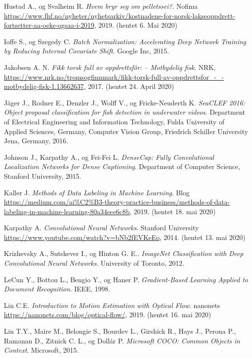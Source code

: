 \documentclass[11ot]{article}
\begin{document}
\begin{thebibliography}{9}
Hustad A., og Svalheim R.
\textit{Hvem bryr seg om pelletssei?}. 
Nofima \url{https://www.fhf.no/nyheter/nyhetsarkiv/kostnadene-for-norsk-lakseoppdrett-fortsetter-aa-oeke-ogsaa-i-2019}, 2019. (hentet 6. Mai 2020)

Ioffe S., og Szegedy C. 
\textit{Batch Normalization: Accelerating Deep Network Training by Reducing Internal Covariate Shift}. 
Google Inc, 2015.

Jakobsen A. N.
\textit{Fikk torsk full av oppdrettsfôr: – Motbydelig fisk}. 
NRK, \url{https://www.nrk.no/tromsogfinnmark/fikk-torsk-full-av-oppdrettsfor_-_-motbydelig-fisk-1.13662637}, 2017. (hentet 24. April 2020)

Jäger J., Rodner E., Denzler J., Wolff V., og Fricke-Neuderth K. 
\textit{SeaCLEF 2016: Object proposal classification for fish detection in underwater videos}. 
Department of Electrical Engineering and Information Technology, Fulda University of Applied Sciences, Germany, Computer Vision Group, Friedrich Schiller University Jena, Germany, 2016.

Johnson J., Karpathy A., og Fei-Fei L. 
\textit{DenseCap: Fully Convolutional Localization Networks for Dense Captioning}. 
Department of Computer Science, Stanford University, 2015.

Kaller J. 
\textit{Methods of Data Labeling in Machine Learning}. 
Blog \url{https://medium.com/ai%C2%B3-theory-practice-business/methods-of-data-labeling-in-machine-learning-80a34ece6c8b}, 2019. (hentet 18. mai 2020)

Karpathy A. 
\textit{Convolutional Neural Networks}. 
Stanford University \url{https://www.youtube.com/watch?v=bNb2fEVKeEo}, 2014. (hentet 13. mai 2020)

Krizhevsky A., Sutskever  I., og Hinton G. E.. 
\textit{ImageNet Classification with Deep Convolutional Neural Networks}. 
University of Toronto, 2012.

LeCun Y., Bottou L., Bengio Y., og Haner P. 
\textit{Gradient-Based Learning Applied to Document Recognition}. 
IEEE, 1998.

Lin C.E. 
\textit{Introduction to Motion Estimation with Optical Flow}. 
nanonets \url{https://nanonets.com/blog/optical-flow/}, 2019. (hentet 16. mai 2020)

Lin T.Y., Maire M., Belongie S., Bourdev L., Girshick R., Hays J., Perona P., Ramanan D., Zitnick C. L., og Dollár P. 
\textit{Microsoft COCO: Common Objects in Context}. 
Microsoft, 2015.


\end{thebibliography}
\end{document}
